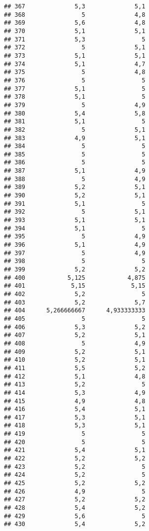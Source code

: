 \documentclass[
]{article}
\begin{document}
\begin{verbatim}
## 367              5,3              5,1
## 368                5              4,8
## 369              5,6              4,8
## 370              5,1              5,1
## 371              5,3                5
## 372                5              5,1
## 373              5,1              5,1
## 374              5,1              4,7
## 375                5              4,8
## 376                5                5
## 377              5,1                5
## 378              5,1                5
## 379                5              4,9
## 380              5,4              5,8
## 381              5,1                5
## 382                5              5,1
## 383              4,9              5,1
## 384                5                5
## 385                5                5
## 386                5                5
## 387              5,1              4,9
## 388                5              4,9
## 389              5,2              5,1
## 390              5,2              5,1
## 391              5,1                5
## 392                5              5,1
## 393              5,1              5,1
## 394              5,1                5
## 395                5              4,9
## 396              5,1              4,9
## 397                5              4,9
## 398                5                5
## 399              5,2              5,2
## 400            5,125            4,875
## 401             5,15             5,15
## 402              5,2                5
## 403              5,2              5,7
## 404      5,266666667      4,933333333
## 405                5                5
## 406              5,3              5,2
## 407              5,2              5,1
## 408                5              4,9
## 409              5,2              5,1
## 410              5,2              5,1
## 411              5,5              5,2
## 412              5,1              4,8
## 413              5,2                5
## 414              5,3              4,9
## 415              4,9              4,8
## 416              5,4              5,1
## 417              5,3              5,1
## 418              5,3              5,1
## 419                5                5
## 420                5                5
## 421              5,4              5,1
## 422              5,2              5,2
## 423              5,2                5
## 424              5,2                5
## 425              5,2              5,2
## 426              4,9                5
## 427              5,2              5,2
## 428              5,4              5,2
## 429              5,6                5
## 430              5,4              5,2

\end{verbatim}
\end{document}
